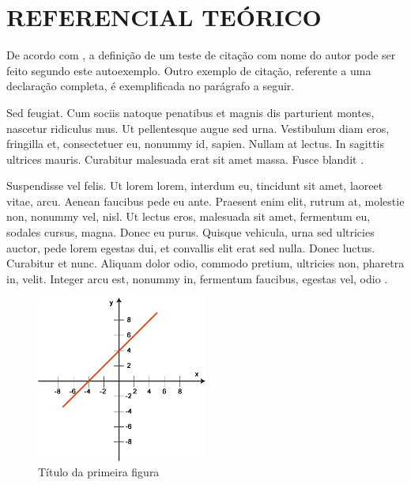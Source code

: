 
\chapter{REFERENCIAL TEÓRICO}\label{referencial}


De acordo com , a definição de um teste de citação com nome do autor pode ser feito segundo este autoexemplo. Outro exemplo de citação, referente a uma declaração completa, é exemplificada no parágrafo a seguir.

Sed feugiat. Cum sociis natoque penatibus et magnis dis parturient montes, nascetur ridiculus mus. Ut pellentesque augue sed urna. Vestibulum diam eros, fringilla et, consectetuer eu, nonummy id, sapien. Nullam at lectus. In sagittis ultrices mauris. Curabitur malesuada erat sit amet massa. Fusce blandit \cite{AtkinsJones2012,AtkinsPaula2014}.




Suspendisse vel felis. Ut lorem lorem, interdum eu, tincidunt sit amet, laoreet vitae, arcu. Aenean faucibus pede eu ante. Praesent enim elit, rutrum at, molestie non, nonummy vel, nisl. Ut lectus eros, malesuada sit amet, fermentum eu, sodales cursus, magna. Donec eu purus. Quisque vehicula, urna sed ultricies auctor, pede lorem egestas dui, et convallis elit erat sed nulla. Donec luctus. Curabitur et nunc. Aliquam dolor odio, commodo pretium, ultricies non, pharetra in, velit. Integer arcu est, nonummy in, fermentum faucibus, egestas vel, odio \cite{AzevedoFernandes2015,BairdCann2011,BaptistaEA2014,BergmanEA2015}.



\begin{figure}[H]
\centering
\caption{Título da primeira figura}\label{fig1}
\includegraphics[width=0.5\textwidth]{./dados/figuras/exemplo_fig1.png}
\end{figure}





